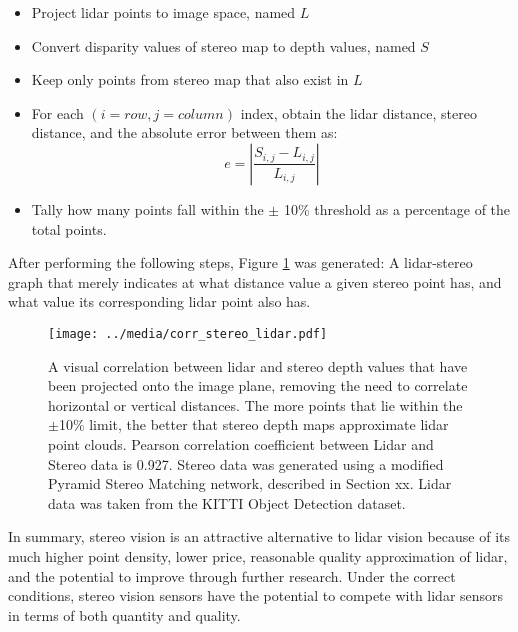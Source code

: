 \begin{itemize} \itemsep=-0.5em
    \item Project lidar points to image space, named $L$
    \item Convert disparity values of stereo map to depth values, named $S$
    \item Keep only points from stereo map that also exist in $L$
    \item For each $(i=row,j=column)$ index, obtain the lidar distance, stereo distance, and the absolute error between them as:
\begin{equation}
    e = \left | \frac{S_{i,j} - L_{i,j}}{L_{i,j}} \right |
    \label{eq_errCalc}
\end{equation}
    \item Tally how many points fall within the $\pm$ 10\% threshold as a percentage of the total points.
\end{itemize}

After performing the following steps, Figure \ref{corr_disp_lidar} was generated: A lidar-stereo graph that merely indicates at what distance value a given stereo point has, and what value its corresponding lidar point also has.

\begin{figure}[ht]
	\centering
	\texttt{[image: ../media/corr\_stereo\_lidar.pdf]}
	\caption{A visual correlation between lidar and stereo depth values that have been projected onto the image plane, removing the need to correlate horizontal or vertical distances. The more points that lie within the $\pm$10\% limit, the better that stereo depth maps approximate lidar point clouds. Pearson correlation coefficient between Lidar and Stereo data is 0.927. Stereo data was generated using a modified Pyramid Stereo Matching network, described in Section xx. Lidar data was taken from the KITTI Object Detection dataset.}
	\label{corr_disp_lidar}
\end{figure}

In summary, stereo vision is an attractive alternative to lidar vision because of its much higher point density, lower price, reasonable quality approximation of lidar, and the potential to improve through further research. Under the correct conditions, stereo vision sensors have the potential to compete with lidar sensors in terms of both quantity and quality.




\newpage
